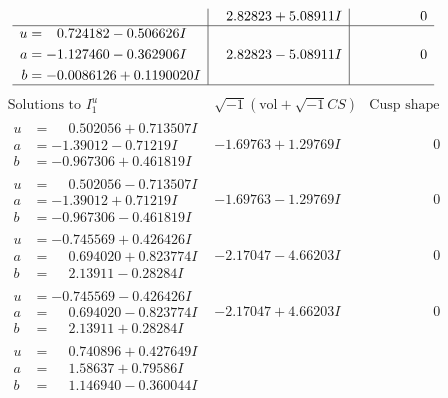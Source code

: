 \documentclass[1p]{elsarticle_modified}
\theoremstyle{definition}
\newcommand{\I}{\sqrt{-1}}
\begin{document}
$$\begin{array}{c|c|c}
 & \phantom{-}2.82823 + 5.08911 I & \phantom{-0.000000 } 0 \\ \hline\begin{aligned}
u &= \phantom{-}0.724182 - 0.506626 I \\
a &= -1.127460 - 0.362906 I \\
b &= -0.0086126 + 0.1190020 I\end{aligned}
 & \phantom{-}2.82823 - 5.08911 I & \phantom{-0.000000 } 0\\
 \hline 
 \end{array}$$\newpage$$\begin{array}{c|c|c}  
\text{Solutions to }I^u_{1}& \I (\text{vol} + \sqrt{-1}CS) & \text{Cusp shape}\\
 \hline 
\begin{aligned}
u &= \phantom{-}0.502056 + 0.713507 I \\
a &= -1.39012 - 0.71219 I \\
b &= -0.967306 + 0.461819 I\end{aligned}
 & -1.69763 + 1.29769 I & \phantom{-0.000000 } 0 \\ \hline\begin{aligned}
u &= \phantom{-}0.502056 - 0.713507 I \\
a &= -1.39012 + 0.71219 I \\
b &= -0.967306 - 0.461819 I\end{aligned}
 & -1.69763 - 1.29769 I & \phantom{-0.000000 } 0 \\ \hline\begin{aligned}
u &= -0.745569 + 0.426426 I \\
a &= \phantom{-}0.694020 + 0.823774 I \\
b &= \phantom{-}2.13911 - 0.28284 I\end{aligned}
 & -2.17047 - 4.66203 I & \phantom{-0.000000 } 0 \\ \hline\begin{aligned}
u &= -0.745569 - 0.426426 I \\
a &= \phantom{-}0.694020 - 0.823774 I \\
b &= \phantom{-}2.13911 + 0.28284 I\end{aligned}
 & -2.17047 + 4.66203 I & \phantom{-0.000000 } 0 \\ \hline\begin{aligned}
u &= \phantom{-}0.740896 + 0.427649 I \\
a &= \phantom{-}1.58637 + 0.79586 I \\
b &= \phantom{-}1.146940 - 0.360044 I\end{aligned}

\end{array}$$
\end{document}
